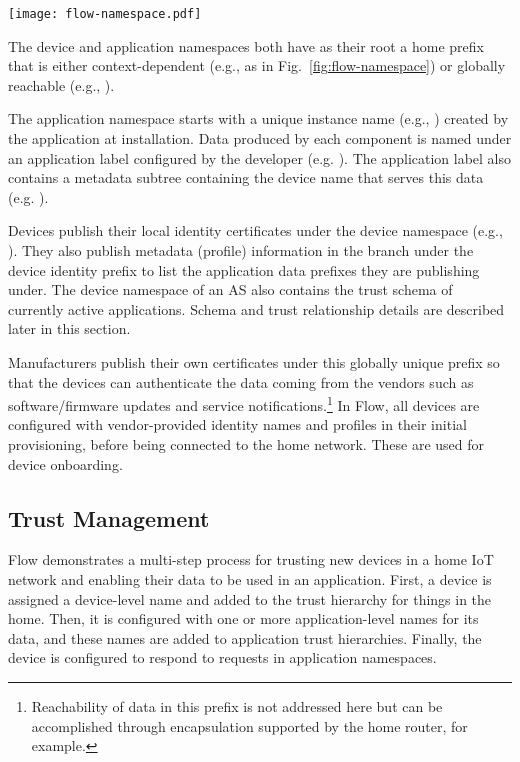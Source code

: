\begin{figure*}[!t]
\centering
\texttt{[image: flow-namespace.pdf]}
\caption{Example namespace within the home environment where Flow is deployed.}
\label{fig:flow-namespace}
\end{figure*}

The device and application namespaces both have as their root a home prefix that is either context-dependent (e.g.,  as in Fig.~\ref{fig:flow-namespace}) or globally reachable (e.g., ).

The application namespace starts with a unique instance name (e.g., ) created by the application at installation. 
Data produced by each component is named under an application label configured by the developer (e.g. ). The application label also contains a metadata subtree containing the device name that serves this data (e.g. ).

Devices publish their local identity certificates under the device namespace (e.g., ).
They also publish metadata (profile) information in the  branch under the device identity prefix to list the application data prefixes they are publishing under. 
The device namespace of an AS also contains the trust schema of currently active applications. 
Schema and trust relationship details are described later in this section.

Manufacturers publish their own certificates under this globally unique prefix so that the devices can authenticate the data coming from the vendors such as software/firmware updates and service notifications.\footnote{Reachability of data in this prefix is not addressed here but can be accomplished through encapsulation supported by the home router, for example.}
In Flow, all devices are configured with vendor-provided identity names and profiles in their initial provisioning, before being connected to the home network. These are used for device onboarding.

\subsection{Trust Management}
\label{sec:trust-management}

Flow demonstrates a multi-step process for trusting new devices in a home IoT network and enabling their data to be used in an application. 
First, a device is assigned a device-level name and added to the trust hierarchy for things in the home. 
Then, it is configured with one or more application-level names for its data, and these names are added to application trust hierarchies. 
Finally, the device is configured to respond to requests in application namespaces. 

